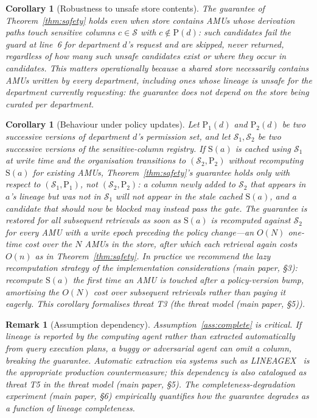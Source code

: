 \documentclass[9pt,twocolumn,twoside]{extarticle}
\newtheorem{corollary}[theorem]{Corollary}
\newtheorem*{remark}{Remark}
\begin{document}
\begin{corollary}[Robustness to unsafe store contents]
\label{cor:unsafe-contents}
The guarantee of Theorem~\ref{thm:safety} holds even when \textit{store}
contains AMUs whose derivation paths touch sensitive columns
$c \in \mathcal{S}$ with $c \notin \mathrm{P}(d)$: such candidates fail the
guard at line~6 for department $d$'s request and are skipped, never
returned, regardless of how many such unsafe candidates exist or where they
occur in \textit{candidates}.
This matters operationally because a shared store necessarily contains AMUs
written by \emph{every} department, including ones whose lineage is
unsafe for the department currently requesting: the guarantee does not
depend on the store being curated per department.
\end{corollary}

\begin{corollary}[Behaviour under policy updates]
\label{cor:policy-update}
Let $\mathrm{P}_1(d)$ and $\mathrm{P}_2(d)$ be two successive versions of
department $d$'s permission set, and let $\mathcal{S}_1, \mathcal{S}_2$ be
two successive versions of the sensitive-column registry.
If $\mathrm{S}(a)$ is cached using $\mathcal{S}_1$ at write time and the
organisation transitions to $(\mathcal{S}_2, \mathrm{P}_2)$ without
recomputing $\mathrm{S}(a)$ for existing AMUs, Theorem~\ref{thm:safety}'s
guarantee holds only with respect to $(\mathcal{S}_1, \mathrm{P}_1)$, not
$(\mathcal{S}_2, \mathrm{P}_2)$: a column newly added to $\mathcal{S}_2$ that
appears in $a$'s lineage but was not in $\mathcal{S}_1$ will not appear in the
stale cached $\mathrm{S}(a)$, and a candidate that should now be blocked may
instead pass the gate.
The guarantee is restored for all subsequent retrievals as soon as
$\mathrm{S}(a)$ is recomputed against $\mathcal{S}_2$ for every AMU with a
write epoch preceding the policy change---an $O(N)$ one-time cost over the
$N$ AMUs in the store, after which each retrieval again costs $O(n)$ as in
Theorem~\ref{thm:safety}.
In practice we recommend the lazy recomputation strategy of
the implementation considerations (main paper, \S3): recompute $\mathrm{S}(a)$ the first time an AMU
is touched after a policy-version bump, amortising the $O(N)$ cost over
subsequent retrievals rather than paying it eagerly.
This corollary formalises threat T3 (the threat model (main paper, \S5)).
\end{corollary}

\begin{remark}[Assumption dependency]
Assumption~\ref{ass:complete} is critical.
If lineage is reported by the computing agent rather than extracted automatically
from query execution plans, a buggy or adversarial agent can omit a column,
breaking the guarantee.
Automatic extraction via systems such as LINEAGEX~\cite{zhang2025lineagex} is
the appropriate production countermeasure; this dependency is also catalogued
as threat T5 in the threat model (main paper, \S5).
The completeness-degradation experiment (main paper, \S6) empirically quantifies how the guarantee degrades
as a function of lineage completeness.
\end{remark}
\end{document}

